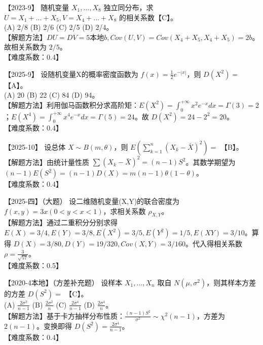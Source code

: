\documentclass[zihao=4, a4paper, fontset=mac]{ctexart}
\begin{document}
【2023-9】 随机变量 $X_1,...,X_8$ 独立同分布，求 $U=X_1+...+X_5, V=X_4+...+X_8$ 的相关系数【C】。\\
(A) 2/8 \quad (B) 2/6 \quad (C) 2/5 \quad (D) 2/4。\\
【解题方法】$DU=DV=5本地b, Cov(U,V)=Cov(X_4+X_5, X_4+X_5)=2b$。故相关系数为 $2/5$。\\
【难度系数：0.4】

\par\vspace{\baselineskip}

【2025-9】 设随机变量X的概率密度函数为 $f(x)=\frac{1}{2}e^{-|x|}$，则 $D(X^2)=$ 【A】。\\
(A) 20 \quad (B) 22 \quad (C) 84 \quad (D) 94。\\
【解题方法】利用伽马函数积分求高阶矩：$E(X^2)=\int_0^{+\infty} x^2 e^{-x}dx = \Gamma(3)=2$；$E(X^4)=\int_0^{+\infty} x^4 e^{-x}dx = \Gamma(5)=24$。故 $D(X^2)=24-2^2=20$。\\
【难度系数：0.4】

\par\vspace{\baselineskip}

【2025-10】 设总体 $X\sim B(m,\theta)$，则 $E(\sum_{k=1}^n (X_k-\bar{X})^2)=$ 【B】。\\
【解题方法】由统计量性质 $\sum (X_k-\bar{X})^2 = (n-1)S^2$。其数学期望为 $(n-1)E(S^2)=(n-1)D(X) = m(n-1)\theta(1-\theta)$。\\
【难度系数：0.4】

\par\vspace{\baselineskip}

【2025-四】（大题） 设二维随机变量(X,Y)的联合密度为 $f(x,y)=3x (0<y<x<1)$，求相关系数 $\rho_{X,Y}$。\\
【解题方法】通过二重积分分别求得 $E(X)=3/4, E(Y)=3/8, E(X^2)=3/5, E(Y^2)=1/5, E(XY)=3/10$。算得 $D(X)=3/80, D(Y)=19/320, Cov(X,Y)=3/160$。代入得相关系数 $\rho = \frac{3}{\sqrt{57}}$。\\
【难度系数：0.5】

\par\vspace{\baselineskip}

【2020-4本地】（方差补充题） 设样本 $X_1,...,X_n$ 取自 $N(\mu,\sigma^2)$，则其样本方差的方差 $D(S^2) = $ 【C】。\\
(A) $\frac{2\sigma^2}{n-1}$ \quad (B) $\frac{2\sigma^2}{n}$ \quad (C) $\frac{2\sigma^4}{n-1}$ \quad (D) $\frac{2\sigma^4}{n}$。\\
【解题方法】基于卡方抽样分布性质：$\frac{(n-1)S^2}{\sigma^2}\sim\chi^2(n-1)$，方差为 $2(n-1)$。变换即得 $D(S^2)=\frac{2\sigma^4}{n-1}$。\\
【难度系数：0.4】
\end{document}
